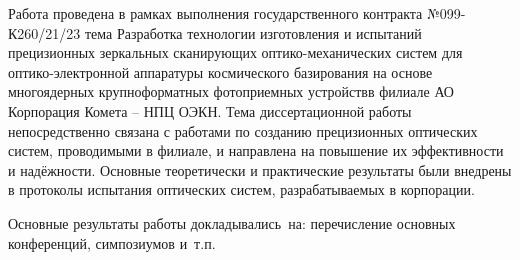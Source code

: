 {\realisation} Работа проведена в рамках выполнения государственного контракта №099-К260/21/23 тема \flqq Разработка технологии изготовления и испытаний прецизионных зеркальных сканирующих оптико-механических систем для оптико-электронной аппаратуры космического базирования на основе многоядерных крупноформатных фотоприемных устройств\frqq  в филиале АО \flqq Корпорация \glqq Комета \grqq -- \glqq НПЦ ОЭКН\grqq \frqq. Тема диссертационной работы непосредственно связана с работами по созданию прецизионных оптических систем, проводимыми в филиале, и направлена на повышение их эффективности и надёжности. Основные теоретически и практические результаты были внедрены в протоколы испытания оптических систем, разрабатываемых в корпорации.

{\probation}
Основные результаты работы докладывались~на:
перечисление основных конференций, симпозиумов и~т.\:п.


